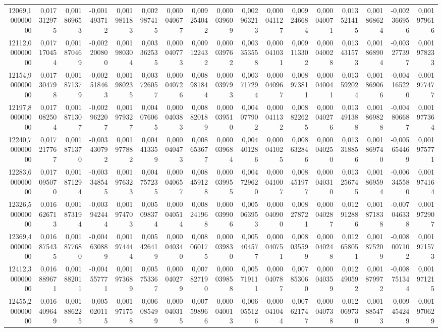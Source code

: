 \begin{longtable}{rrrrrrrrrrrrrrrrr}
12069,100000000 & 0,017312975 & 0,001869653 & -0,001493712 & 0,001981183 & 0,002987415 & 0,000040677 & 0,009254042 & 0,000039609 & 0,002963213 & 0,000041127 & 0,009246684 & 0,000040071 & 0,013521415 & 0,001868624 & -0,002366956 & 0,001979616\\
12112,000000000 & 0,017170454 & 0,001870469 & -0,002200800 & 0,001980304 & 0,003362535 & 0,000040773 & 0,009122432 & 0,000039762 & 0,003353558 & 0,000041031 & 0,009113302 & 0,000040028 & 0,013431573 & 0,001868904 & -0,003277397 & 0,001978233\\
12154,900000000 & 0,017304798 & 0,001871379 & -0,002518463 & 0,001980235 & 0,003726057 & 0,000040726 & 0,008981844 & 0,000039793 & 0,003717294 & 0,000040967 & 0,008973811 & 0,000040041 & 0,013592024 & 0,001869066 & -0,004165220 & 0,001977477\\
12197,800000000 & 0,017082504 & 0,001871307 & -0,002962207 & 0,001979327 & 0,004076065 & 0,000040383 & 0,008820189 & 0,000039510 & 0,004077902 & 0,000041132 & 0,008822625 & 0,000040276 & 0,013491388 & 0,001869828 & -0,004806687 & 0,001977364\\
12240,700000000 & 0,017217767 & 0,001871370 & -0,003430792 & 0,001977882 & 0,004413359 & 0,000040473 & 0,008653677 & 0,000039684 & 0,004401286 & 0,000041025 & 0,008632846 & 0,000040250 & 0,013318856 & 0,001869740 & -0,005654469 & 0,001975771\\
12283,600000000 & 0,017095070 & 0,001871294 & -0,003348545 & 0,001976323 & 0,004757235 & 0,000040657 & 0,008459128 & 0,000039955 & 0,004729620 & 0,000041007 & 0,008451977 & 0,000040310 & 0,013256745 & 0,001869594 & -0,006345580 & 0,001974164\\
12326,500000000 & 0,016626713 & 0,001873194 & -0,003942444 & 0,001974703 & 0,005098374 & 0,000040514 & 0,008241968 & 0,000039906 & 0,005063953 & 0,000040900 & 0,008278721 & 0,000040287 & 0,012912886 & 0,001871838 & -0,007046338 & 0,001972907\\
12369,400000000 & 0,016875435 & 0,001877680 & -0,004630889 & 0,001974444 & 0,005426419 & 0,000040340 & 0,008060175 & 0,000039830 & 0,005404577 & 0,000040751 & 0,008035599 & 0,000040248 & 0,012658051 & 0,001875209 & -0,008007102 & 0,001971573\\
12412,300000000 & 0,016889671 & 0,001882011 & -0,004557771 & 0,001973689 & 0,005753367 & 0,000040279 & 0,007827190 & 0,000039858 & 0,005719111 & 0,000040787 & 0,007853060 & 0,000040359 & 0,012490592 & 0,001879972 & -0,008751344 & 0,001971215\\
12455,200000000 & 0,016409649 & 0,001886225 & -0,005020115 & 0,001971758 & 0,006085499 & 0,000040315 & 0,007598966 & 0,000040013 & 0,006055126 & 0,000041044 & 0,007621747 & 0,000040738 & 0,012069730 & 0,001885473 & -0,009454249 & 0,001970629\\

\end{longtable}
